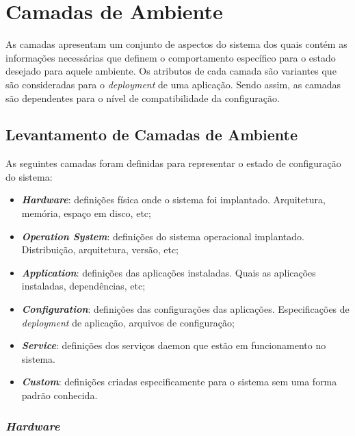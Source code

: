 \section{Camadas de Ambiente}
\label{sec:cam-amb}

As camadas apresentam um conjunto de aspectos do sistema dos quais contém as
informações necessárias que definem o comportamento específico para o
estado desejado para aquele ambiente. Os atributos de cada camada são variantes
que são consideradas para o \textit{deployment} de uma aplicação. Sendo assim, as
camadas são dependentes para o nível de compatibilidade da configuração.

\subsection{Levantamento de Camadas de Ambiente}
As seguintes camadas foram definidas para representar o estado de configuração do
sistema:
\begin{itemize}
  \item \textit{\textbf{Hardware}}: definições física onde o sistema foi implantado.
    Arquitetura, memória, espaço em disco, etc;
  \item \textit{\textbf{Operation System}}: definições do sistema operacional
    implantado. Distribuição, arquitetura, versão, etc;
  \item \textit{\textbf{Application}}: definições das aplicações instaladas.
    Quais as aplicações instaladas, dependências, etc;
  \item \textit{\textbf{Configuration}}: definições das configurações das
    aplicações. Especificações de \textit{deployment} de aplicação, arquivos
    de configuração;
  \item \textit{\textbf{Service}}: definições dos serviços daemon que estão em
    funcionamento no sistema.
  \item \textit{\textbf{Custom}}: definições criadas especificamente para o
    sistema sem uma forma padrão conhecida.
\end{itemize}

\subsubsection{\textit{Hardware}}
\label{sec:cam-hard}

